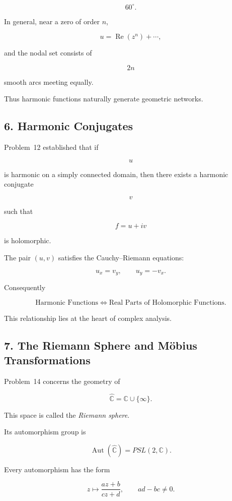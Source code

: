 \documentclass[12pt,a4paper]{article}
\theoremstyle{notespace}
\begin{document}
\[
60^\circ.
\]

In general, near a zero of order \(n\),

\[
u
=
\operatorname{Re}(z^n)+\cdots,
\]

and the nodal set consists of

\[
2n
\]

smooth arcs meeting equally.

Thus harmonic functions naturally generate geometric networks.

\bigskip

\subsection{6. Harmonic Conjugates}

Problem~12 established that if

\[
u
\]

is harmonic on a simply connected domain, then there exists a harmonic conjugate

\[
v
\]

such that

\[
f=u+iv
\]

is holomorphic.

The pair \((u,v)\) satisfies the Cauchy--Riemann equations:

\[
u_x=v_y,
\qquad
u_y=-v_x.
\]

Consequently

\[
\boxed{
	\text{Harmonic Functions}
	\Longleftrightarrow
	\text{Real Parts of Holomorphic Functions}.
}
\]

This relationship lies at the heart of complex analysis.

\bigskip

\subsection{7. The Riemann Sphere and Möbius Transformations}

Problem~14 concerns the geometry of

\[
\widehat{\mathbb C}
=
\mathbb C\cup\{\infty\}.
\]

This space is called the \emph{Riemann sphere}.

Its automorphism group is

\[
\operatorname{Aut}(\widehat{\mathbb C})
=
PSL(2,\mathbb C).
\]

Every automorphism has the form

\[
z
\mapsto
\frac{az+b}{cz+d},
\qquad
ad-bc\neq0.
\]
\end{document}
